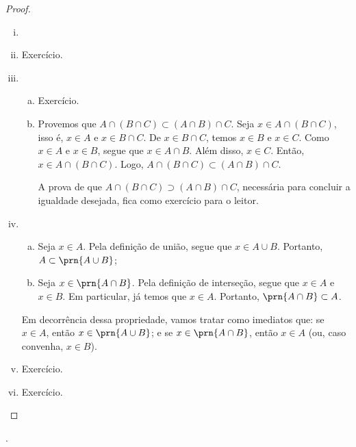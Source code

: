 \begin{proof}
\begin{enumerate}[i)]
    \item[]
    \item Exercício.
    \item
    \begin{enumerate}[a)]
        \item Exercício.
        \item
            Provemos que $A \cap (B \cap C) \subset (A \cap B) \cap C$. Seja $x \in A \cap (B \cap C)$, isso é, $x \in A$ e $x \in B \cap C$. De $x \in B \cap C$, temos $x \in B$ e $x \in C$. Como $x \in A$ e $x \in B$, segue que $x \in A \cap B$. Além disso, $x \in C$. Então, $x \in A \cap (B \cap C)$. Logo, $A \cap (B \cap C) \subset (A \cap B) \cap C$. 

            A prova de que $A \cap (B \cap C) \supset (A \cap B) \cap C$, necessária para concluir a igualdade desejada, fica como exercício para o leitor.
    \end{enumerate}

    \item 	

    \begin{enumerate}[a)]
        \item
            Seja $x \in A$. Pela definição de união, segue que $x \in A \cup B$. Portanto, $A \subset \prn{A \cup B}$;
        \item
            Seja $x \in \prn{A \cap B}$. Pela definição de interseção, segue que $x\in A$ e $x \in B$. 
        Em particular, já temos que $x \in A$. Portanto, $\prn{A \cap B} \subset A$.
    \end{enumerate}
    Em decorrência dessa propriedade, vamos tratar como imediatos que: 
    se $x \in A$, então $x \in \prn{A \cup B}$; 
    e se $x \in \prn{A \cap B}$, então $x\in A$ (ou, caso convenha, $x\in B$).
    
    \item Exercício.
    \item Exercício.
\end{enumerate}
\end{proof}

\begin{onlineact}
.
\end{onlineact}
